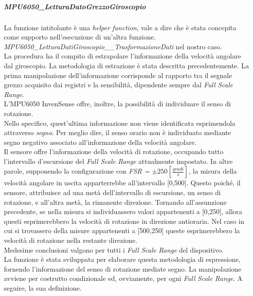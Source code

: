 \documentclass[11pt]{report}
\begin{document}
\subparagraph{MPU6050\_LetturaDatoGrezzoGiroscopio}
La funzione intitolante è una \textit{helper function}, vale a dire che è stata concepita come supporto nell'esecuzione di un'altra funzione.\\
\textit{MPU6050\_LetturaDatiGiroscopio\_\_TrasformazioneDati} nel nostro caso.\\
La procedura ha il compito di estrapolare l'informazione della velocità angolare dal giroscopio. La metodologia di estrazione è stata descritta precedentemente. 
La prima manipolazione dell'informazione corrisponde al rapporto tra il segnale grezzo acquisito dai registri e la sensibilità, dipendente sempre dal \textit{Full Scale Range}.\\
L'MPU6050 InvenSense offre, inoltre, la possibilità di individuare il senso di rotazione.\\
Nello specifico, quest'ultima informazione non viene identificata esprimendola attraverso \textit{segno}. Per meglio dire, il senso orario non è individuato mediante segno negativo associato all'informazione della velocità angolare.\\
Il sensore offre l'informazione della velocità di rotazione, occupando tutto l'intervallo d'escursione del \textit{Full Scale Range} attualmente impostato. In altre parole, supponendo la configurazione con \textit{FSR = $\pm250[\frac{gradi}{s}]$}, la misura della velocità angolare in uscita apparterrebbe all'intervallo [0,500].
Questo poiché, il sensore, attribuisce ad una metà dell'intervallo di escursione, un senso di rotazione, e all'altra metà, la rimanente direzione. Tornando all'assunzione precedente, se nella misura si individuassero valori appartenenti a [0,250], allora questi esprimerebbero la velocità di rotazione in direzione antioraria. 
Nel caso in cui si trovassero della misure appartenenti a [500,250] queste esprimerebbero la velocità di rotazione nella restante direzione.\\
Medesime conclusioni valgono per tutti i \textit{Full Scale Range} del dispositivo.\\
La funzione è stata sviluppata per elaborare questa metodologia di espressione, fornendo l'informazione del senso di rotazione mediate segno. La manipolazione avviene per costrutto condizionale ed, ovviamente, per ogni \textit{Full Scale Range}.
A seguire, la sua definizione.

\end{document}
